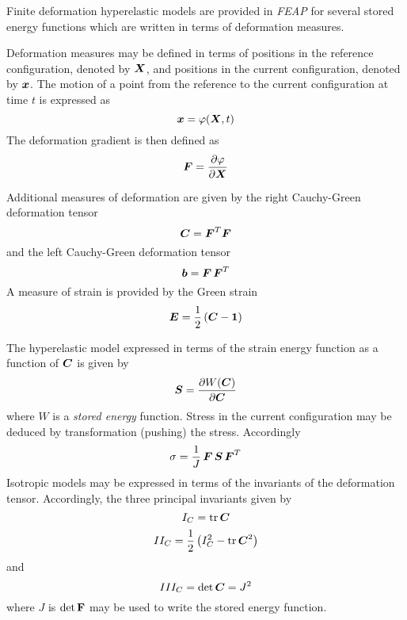 Finite deformation hyperelastic models are provided in {\sl FEAP} for
several stored energy functions which are written in terms of deformation
measures.

Deformation measures may be defined in terms of positions in the reference
configuration, denoted by $\boldsymbol{X}$, and positions in the current
configuration, denoted by $\boldsymbol{x}$.  The motion of a point from the
reference to the current configuration at time $t$ is expressed as
\begin{equation}
\boldsymbol{x} = \mathbf{\varphi} ( \boldsymbol{X}, t )
\end{equation}
The deformation gradient is then defined as
\begin{equation}
\boldsymbol{F} = \frac{\partial \mathbf{\varphi}}{\partial \boldsymbol{X}}
\end{equation}

Additional measures of deformation are given by the right Cauchy-Green
deformation tensor
\begin{equation}
\boldsymbol{C} = \boldsymbol{F}^T \boldsymbol{F}
\end{equation}
and the left Cauchy-Green deformation tensor
\begin{equation}
\boldsymbol{b} = \boldsymbol{F} \, \boldsymbol{F}^T
\end{equation}
A measure of strain is provided by the Green strain
\begin{equation}
\boldsymbol{E} = \frac{1}{2} \left( \boldsymbol{C} - \boldsymbol{1} \right)
\end{equation}

The hyperelastic model expressed in terms of the strain energy function
as a function of $\boldsymbol{C}$ is given by
\begin{equation}
\boldsymbol{S} = \frac{\partial W(\boldsymbol{C})}{\partial \boldsymbol{C}}
\end{equation}
where $W$ is a {\it stored energy} function.
Stress in the current configuration may be deduced by transformation (pushing)
the stress.  Accordingly
\begin{equation}
\mathbf{\sigma} = \frac{1}{J} \, \boldsymbol{F} \, \boldsymbol{S} \, \boldsymbol{F}^T
\end{equation}
Isotropic models may be
expressed in terms of the invariants of the deformation tensor.  Accordingly,
the three principal invariants given by
\begin{equation}
I_C = {\rm tr} \, \boldsymbol{C}
\end{equation}
\begin{equation}
II_C = \frac{1}{2} \left( I_C^2 - {\rm tr} \, \boldsymbol{C}^2 \right)
\end{equation}
and
\begin{equation}
III_C = \det \boldsymbol{C} = J^2
\end{equation}
where $J$ is $\det \bf{F}$ may be used to write the stored energy function.

